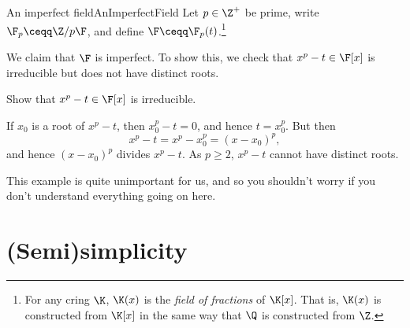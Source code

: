 \begin{exm}{An imperfect field}{AnImperfectField}
	Let $p\in \Z ^+$ be prime, write $\F _p\ceqq \Z /p\F$, and define $\F \ceqq \F _p(t)$.\footnote{For any cring $\K$, $\K (x)$ is the \emph{field of fractions} of $\K [x]$.  That is, $\K (x)$ is constructed from $\K [x]$ in the same way that $\Q$ is constructed from $\Z$.}
	
	We claim that $\F$ is imperfect.  To show this, we check that $x^p-t\in \F [x]$ is irreducible but does not have distinct roots.
	\begin{exr}[breakable=false]{}{}
		Show that $x^p-t\in \F [x]$ is irreducible.
	\end{exr}
	If $x_0$ is a root of $x^p-t$, then $x_0^p-t=0$, and hence $t=x_0^p$.  But then
	\begin{equation}
	x^p-t=x^p-x_0^p=(x-x_0)^p,
	\end{equation}
	and hence $(x-x_0)^p$ divides $x^p-t$.  As $p\geq 2$, $x^p-t$ cannot have distinct roots.
	\begin{rmk}
		This example is quite unimportant for us, and so you shouldn't worry if you don't understand everything going on here.
	\end{rmk}
\end{exm}

\section{(Semi)simplicity}

